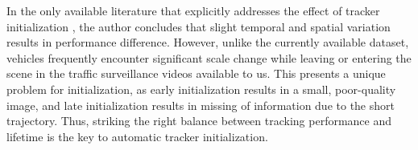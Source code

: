 
In the only available literature that explicitly addresses the effect of tracker initialization \cite{Wu_2013_CVPR}, the author concludes that slight temporal and spatial variation results in performance difference. 
However, unlike the currently available dataset, vehicles frequently encounter significant scale change while leaving or entering the scene in the traffic surveillance videos available to us. This presents a unique problem for initialization, as early initialization results in a small, poor-quality image, and late initialization results in missing of information due to the short trajectory. Thus, striking the right balance between tracking performance and lifetime is the key to automatic tracker initialization.


